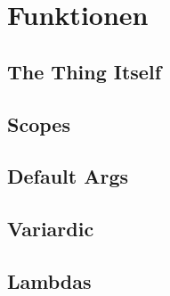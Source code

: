 \chapter{Funktionen}
\section{The Thing Itself}
\section{Scopes}
\section{Default Args}
\section{Variardic}
\section{Lambdas}
